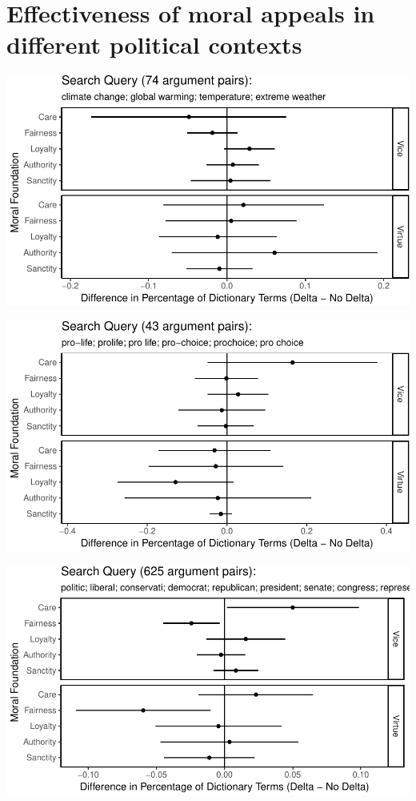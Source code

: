 \documentclass[12pt,]{article}
\begin{document}
\clearpage

\section{Effectiveness of moral appeals in different political
contexts}\label{effectiveness-of-moral-appeals-in-different-political-contexts}

\includegraphics{prelim_files/figure-latex/climate change-1.pdf}

\includegraphics{prelim_files/figure-latex/abortion-1.pdf}

\includegraphics{prelim_files/figure-latex/politics-1.pdf}
\end{document}
